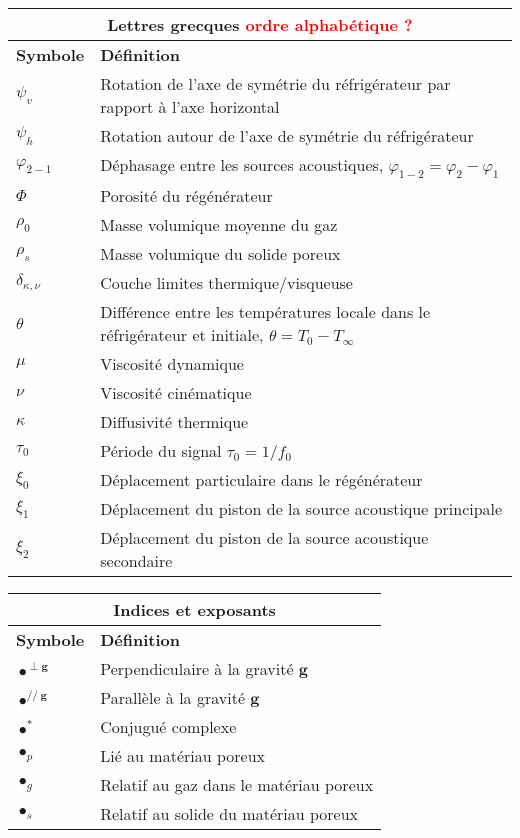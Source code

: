 \begin{center}
    \begin{tabular}{p{} p{}}
        \multicolumn{2}{c}{Lettres grecques \textcolor{red}{ordre alphabétique ?}}  \\\hline
        \textbf{Symbole} & \textbf{Définition} \\\hline\hline
        $\psi_v$ & Rotation de l'axe de symétrie du réfrigérateur par rapport à l'axe horizontal\\
        $\psi_h$ & Rotation autour de l'axe de symétrie du réfrigérateur \\
        $\varphi_{2-1}$ & Déphasage entre les sources acoustiques, $\varphi_{1-2} = \varphi_2 - \varphi_1$\\
        $\Phi$ & Porosité du régénérateur \\
        $\rho_0$ & Masse volumique moyenne du gaz \\
        $\rho_{s}$ & Masse volumique du solide poreux\\
        $\delta_{\kappa,\nu}$ & Couche limites thermique/visqueuse \\
        $\theta$ & Différence entre les températures locale dans le réfrigérateur et initiale, $\theta=T_0-T_\infty$\\
        $\mu$ & Viscosité dynamique \\
        $\nu$ & Viscosité cinématique \\
        $\kappa$ & Diffusivité thermique \\
        $\tau_0$ & Période du signal $\tau_0 = 1/f_0$ \\
        $\xi_0$ & Déplacement particulaire dans le régénérateur \\
        $\xi_1$ & Déplacement du piston de la source acoustique principale \\
        $\xi_2$ & Déplacement du piston de la source acoustique secondaire \\\hline
    \end{tabular}
\end{center}

\bigskip

\begin{center}
    \begin{tabular}{p{} p{}}
		\multicolumn{2}{c}{Indices et exposants}  \\\hline
		\textbf{Symbole} & \textbf{Définition} \\\hline\hline
		$\bullet^{\perp \mathbf g}$ & Perpendiculaire à la gravité $\mathbf g$ \\
		$\bullet^{//~\mathbf g}$ & Parallèle à la gravité $\mathbf g$ \\
		$\bullet^*$ & Conjugué complexe\\
		$\bullet_p$ & Lié au matériau poreux\\		
		$\bullet_g$ & Relatif au gaz dans le matériau poreux\\
		$\bullet_s$ & Relatif au solide du matériau poreux\\
		\hline
	\end{tabular}
\end{center}